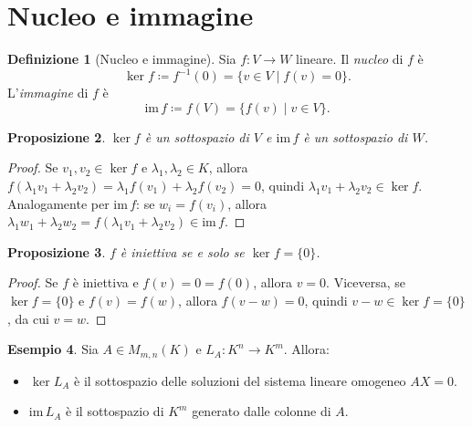 \documentclass[11pt, a4paper]{book}
\theoremstyle{definition}
\newtheorem{definizione}{Definizione}[section]
\newtheorem{esempio}[definizione]{Esempio}
\theoremstyle{plain}
\newtheorem{proposizione}[definizione]{Proposizione}
\theoremstyle{remark}
\newcommand{\im}{\mathrm{im}\,}
\begin{document}
\section{Nucleo e immagine}
\label{sec:kerIm}

\begin{defbox}
\begin{definizione}[Nucleo e immagine]
Sia $f \colon V \to W$ lineare. Il \emph{nucleo} di $f$ è
\[
  \ker f \coloneqq f^{-1}(0) = \{v \in V \mid f(v) = 0\}.
\]
L'\emph{immagine} di $f$ è
\[
  \im f \coloneqq f(V) = \{f(v) \mid v \in V\}.
\]
\end{definizione}
\end{defbox}

\begin{proposizione}
$\ker f$ è un sottospazio di $V$ e $\im f$ è un sottospazio di $W$.
\end{proposizione}

\begin{proof}
Se $v_1, v_2 \in \ker f$ e $\lambda_1, \lambda_2 \in K$, allora $f(\lambda_1 v_1 + \lambda_2 v_2) = \lambda_1 f(v_1) + \lambda_2 f(v_2) = 0$, quindi $\lambda_1 v_1 + \lambda_2 v_2 \in \ker f$. Analogamente per $\im f$: se $w_i = f(v_i)$, allora $\lambda_1 w_1 + \lambda_2 w_2 = f(\lambda_1 v_1 + \lambda_2 v_2) \in \im f$.
\end{proof}

\begin{proposizione}
\label{prop:ker-iniett}
$f$ è iniettiva se e solo se $\ker f = \{0\}$.
\end{proposizione}

\begin{proof}
Se $f$ è iniettiva e $f(v) = 0 = f(0)$, allora $v = 0$. Viceversa, se $\ker f = \{0\}$ e $f(v) = f(w)$, allora $f(v-w) = 0$, quindi $v-w \in \ker f = \{0\}$, da cui $v = w$.
\end{proof}

\begin{exbox}
\begin{esempio}
Sia $A \in M_{m,n}(K)$ e $L_A \colon K^n \to K^m$. Allora:
\begin{itemize}
  \item $\ker L_A$ è il sottospazio delle soluzioni del sistema lineare omogeneo $AX = 0$.
  \item $\im L_A$ è il sottospazio di $K^m$ generato dalle colonne di $A$.
\end{itemize}
\end{esempio}
\end{exbox}
\end{document}
